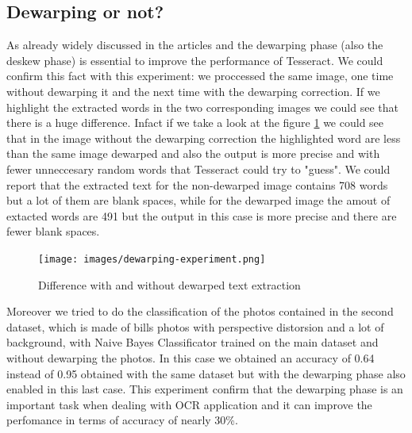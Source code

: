 \documentclass[10pt,twocolumn,letterpaper]{article}
\begin{document}
\subsection{Dewarping or not?}
As already widely discussed in the articles \cite{Improvingcamera-based} and \cite{recoveringhomography} the dewarping phase (also the deskew phase) is essential to improve the performance of Tesseract. We could confirm this fact with this experiment: we proccessed the same image, one time without dewarping it and the next time with the dewarping correction. If we highlight the extracted words in the two corresponding images we could see that there is a huge difference. Infact if we take a look at the figure \ref{dewarping-experiment} we could see that in the image without the dewarping correction the highlighted word are less than the same image dewarped and also the output is more precise and with fewer unneccesary random words that Tesseract could try to "guess". We could report that the extracted text for the non-dewarped image contains 708 words but a lot of them are blank spaces, while for the dewarped image the amout of extacted words are 491 but the output in this case is more precise and there are fewer blank spaces.

\begin{figure}[b]
	\centering
	\texttt{[image: images/dewarping-experiment.png]}
	\caption{Difference with and without dewarped text extraction}
	\label{dewarping-experiment}
\end{figure}

Moreover we tried to do the classification of the photos contained in the second dataset, which is made of bills photos with perspective distorsion and a lot of background, with Naive Bayes Classificator trained on the main dataset and without dewarping the photos. In this case we obtained an accuracy of 0.64 instead of 0.95 obtained with the same dataset but with the dewarping phase also enabled in this last case. This experiment confirm that the dewarping phase is an important task when dealing with OCR application and it can improve the perfomance in terms of accuracy of nearly 30\%.
\end{document}
